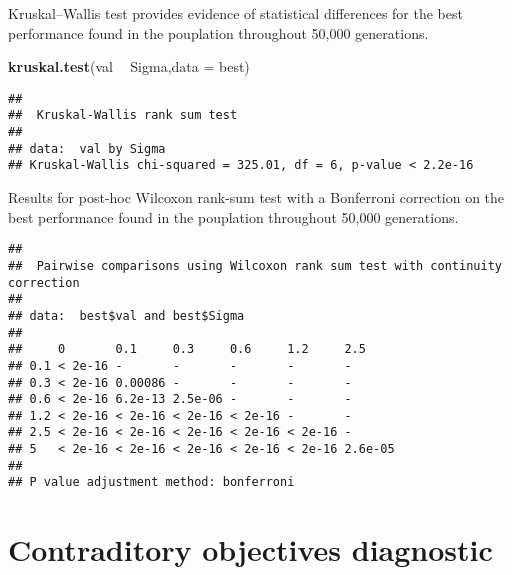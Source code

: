 \documentclass[]{book}
\newenvironment{Shaded}{\begin{snugshade}}{\end{snugshade}}
\newcommand{\DataTypeTok}[1]{\textcolor[rgb]{0.13,0.29,0.53}{#1}}
\newcommand{\KeywordTok}[1]{\textcolor[rgb]{0.13,0.29,0.53}{\textbf{#1}}}
\newcommand{\NormalTok}[1]{#1}
\newcommand{\OperatorTok}[1]{\textcolor[rgb]{0.81,0.36,0.00}{\textbf{#1}}}
\newcommand{\OtherTok}[1]{\textcolor[rgb]{0.56,0.35,0.01}{#1}}
\newcommand{\StringTok}[1]{\textcolor[rgb]{0.31,0.60,0.02}{#1}}
\begin{document}
Kruskal--Wallis test provides evidence of statistical differences for the best performance found in the pouplation throughout 50,000 generations.

\begin{Shaded}
\begin{Highlighting}[]
\KeywordTok{kruskal.test}\NormalTok{(val }\OperatorTok{~}\StringTok{ }\NormalTok{Sigma,}\DataTypeTok{data =}\NormalTok{ best)}
\end{Highlighting}
\end{Shaded}

\begin{verbatim}
## 
##  Kruskal-Wallis rank sum test
## 
## data:  val by Sigma
## Kruskal-Wallis chi-squared = 325.01, df = 6, p-value < 2.2e-16
\end{verbatim}

Results for post-hoc Wilcoxon rank-sum test with a Bonferroni correction on the best performance found in the pouplation throughout 50,000 generations.

\begin{Shaded}
\end{Shaded}

\begin{verbatim}
## 
##  Pairwise comparisons using Wilcoxon rank sum test with continuity correction 
## 
## data:  best$val and best$Sigma 
## 
##     0       0.1     0.3     0.6     1.2     2.5    
## 0.1 < 2e-16 -       -       -       -       -      
## 0.3 < 2e-16 0.00086 -       -       -       -      
## 0.6 < 2e-16 6.2e-13 2.5e-06 -       -       -      
## 1.2 < 2e-16 < 2e-16 < 2e-16 < 2e-16 -       -      
## 2.5 < 2e-16 < 2e-16 < 2e-16 < 2e-16 < 2e-16 -      
## 5   < 2e-16 < 2e-16 < 2e-16 < 2e-16 < 2e-16 2.6e-05
## 
## P value adjustment method: bonferroni
\end{verbatim}

\hypertarget{contraditory-objectives-diagnostic-1}{%
\section{Contraditory objectives diagnostic}\label{contraditory-objectives-diagnostic-1}}
\end{document}
